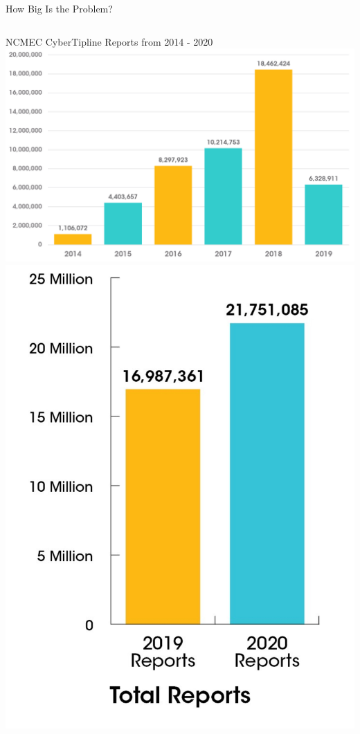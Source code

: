 \documentclass[nobackground,dvipsnames,table,aspectratio=169]{beamer}
\begin{document}
\begin{frame}{How Big Is the Problem?}
    \begin{columns}
            NCMEC CyberTipline Reports from 2014 - 2020\\
            \includegraphics[width=\textwidth]{cybertipline-reports-2014-2018}
            \includegraphics[width=\textwidth]{cybertipline-reports-2019-2020}
    \end{columns}
\end{frame}
\end{document}
